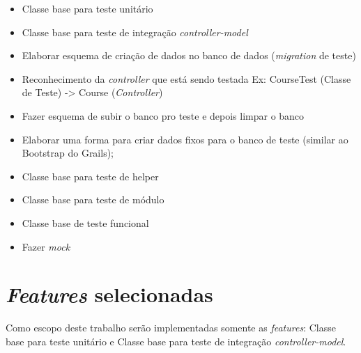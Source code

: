 \begin{itemize}

	\item Classe base para teste unitário
	\item Classe base para teste de integração \textit{controller-model}
	\item Elaborar esquema de criação de dados no banco de dados (\textit{migration} de teste)
	\item Reconhecimento da \textit{controller} que está sendo testada
		\subitem Ex: CourseTest (Classe de Teste) -> Course (\textit{Controller})
	\item Fazer esquema de subir o banco pro teste e depois limpar o banco
	\item Elaborar uma forma para criar dados fixos para o banco de teste (similar ao Bootstrap do Grails);
	\item Classe base para teste de helper
	\item Classe base para teste de módulo
	\item Classe base de teste funcional
	\item Fazer \textit{mock}

\end{itemize}

\section{\textit{Features} selecionadas}

Como escopo deste trabalho serão implementadas somente as \textit{features}: Classe base para teste unitário
e Classe base para teste de integração \textit{controller-model}.